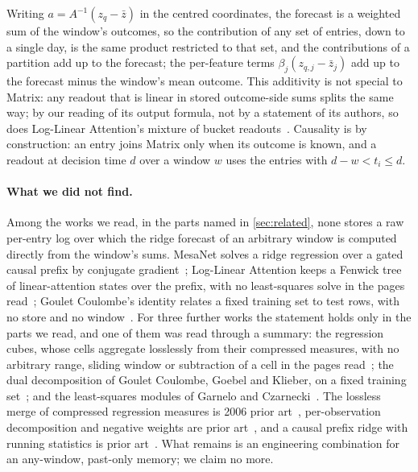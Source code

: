 \documentclass[11pt]{article}
\begin{document}
Writing $a = A^{-1}(z_q - \bar z)$ in the centred coordinates, the forecast is a weighted sum of the
window's outcomes, so the contribution of any set of entries, down to a single day, is the same
product restricted to that set, and the contributions of a partition add up to the forecast; the
per-feature terms $\beta_j (z_{q,j} - \bar z_j)$ add up to the forecast minus the window's mean
outcome. This additivity is not
special to Matrix: any readout that is linear in stored outcome-side sums splits the same way; by our reading of its output formula, not by a statement of its authors, so does Log-Linear Attention's mixture of bucket readouts~\cite{guo2025loglinear}. %
Causality is by construction: an entry joins Matrix only when its outcome is known, and a readout at
decision time $d$ over a window $w$ uses the entries with $d - w < t_i \le d$.

\paragraph{What we did not find.} Among the works we read, in the parts named in
\cref{sec:related}, none stores a raw per-entry log over which the ridge forecast of an arbitrary
window is computed directly from the window's sums. MesaNet solves a ridge regression over a gated
causal prefix by conjugate gradient~\cite{vonoswald2025mesanet}; %
Log-Linear Attention keeps a Fenwick tree of linear-attention states over the prefix, with no
least-squares solve in the pages read~\cite{guo2025loglinear}; %
Goulet Coulombe's identity relates a fixed training set to test rows, with no store and no
window~\cite{gouletcoulombe2025ols}. %
For three further works the statement holds only in the parts we read, and one of them was read
through a summary: the regression cubes, whose cells aggregate losslessly from their compressed
measures, with no arbitrary range, sliding window or subtraction of a cell in the pages
read~\cite{chen2006regcube}; %
the dual decomposition of Goulet Coulombe, Goebel and Klieber, on a fixed training
set~\cite{gouletcoulombe2024dual}; %
and the least-squares modules of Garnelo and Czarnecki~\cite{garnelo2023}. %
The lossless merge of compressed regression measures is 2006 prior art~\cite{chen2006regcube}, %
per-observation decomposition and negative weights are prior art~\cite{gouletcoulombe2024dual}, %
and a causal prefix ridge with running statistics is prior art~\cite{vonoswald2025mesanet}. %
What remains is an engineering combination for an any-window, past-only memory; we claim no more.
\end{document}
